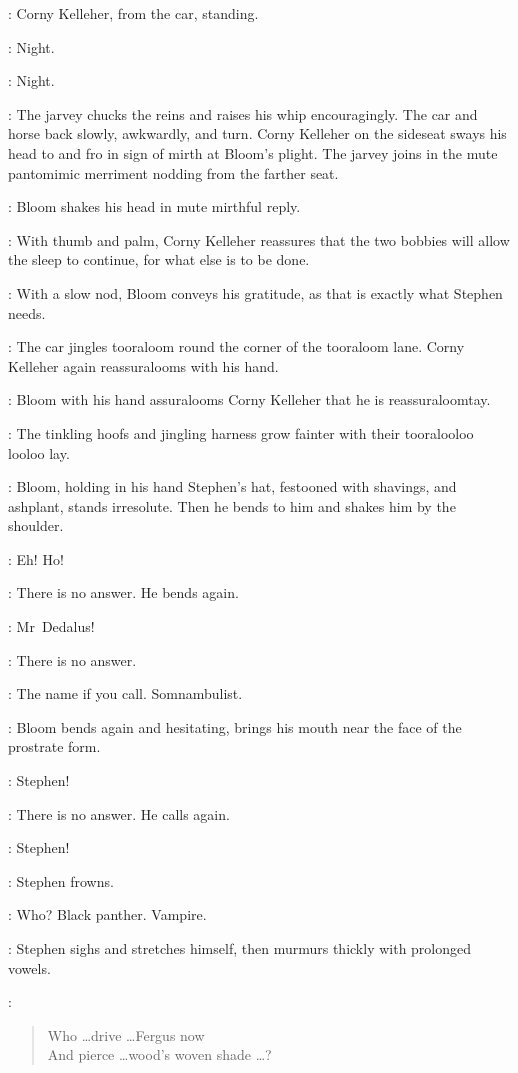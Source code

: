 :
Corny Kelleher, from the car, standing.

\Corny:
Night.

\Bloom:
Night.

:
The jarvey chucks the reins and raises his whip encouragingly.
The car and horse back slowly, awkwardly, and turn.
Corny Kelleher on the sideseat sways his head to and fro
in sign of mirth at Bloom's plight.
The jarvey joins in the mute pantomimic merriment nodding from the farther seat.

:
Bloom shakes his head in mute mirthful reply.

:
With thumb and palm, Corny Kelleher reassures
that the two bobbies will allow the sleep to continue,
for what else is to be done.

:
With a slow nod, Bloom conveys his gratitude,
as that is exactly what Stephen needs.

:
The car jingles tooraloom round the corner of the tooraloom lane.
Corny Kelleher again reassuralooms with his hand.

:
Bloom with his hand assuralooms Corny Kelleher that he is reassuraloomtay.

:
The tinkling hoofs and jingling harness grow fainter
with their tooralooloo looloo lay.

:
Bloom, holding in his hand Stephen's hat,
festooned with shavings, and ashplant, stands irresolute.
Then he bends to him and shakes him by the shoulder.

\Bloom:
Eh! Ho!

:
There is no answer. He bends again.

\Bloom:
Mr~Dedalus!

:
There is no answer.

\Bloom:
The name if you call.
Somnambulist.

:
Bloom bends again and hesitating,
brings his mouth near the face of the prostrate form.

\Bloom:
Stephen!

:
There is no answer. He calls again.

\Bloom:
Stephen!

:
Stephen frowns.

\Stephen:
Who?
Black panther. Vampire.

:
Stephen sighs and stretches himself, then murmurs thickly with prolonged vowels.

\Stephen:
\begin{verse}
    Who \ldots drive \ldots Fergus now\\
    And pierce \ldots wood's woven shade \ldots?
\end{verse}

